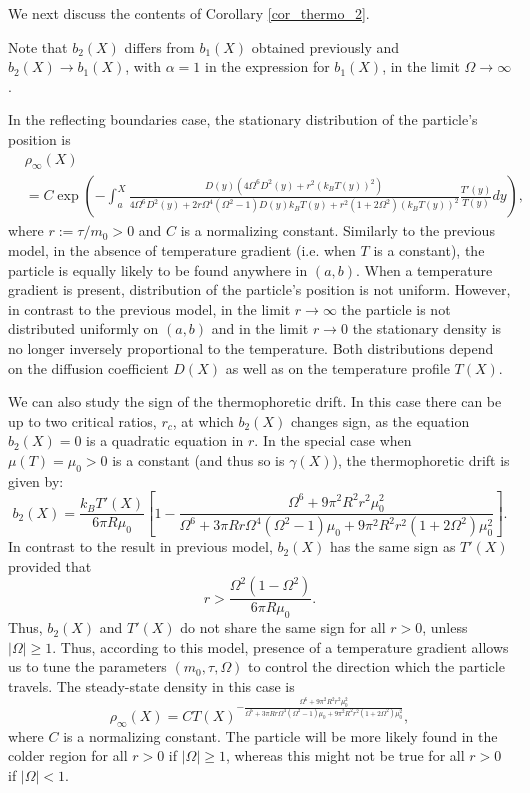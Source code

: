 We next discuss the contents of Corollary \ref{cor_thermo_2}.
\begin{remark}
Note that $b_{2}(X)$ differs from $b_{1}(X)$ obtained previously and $b_{2}(X) \to b_{1}(X)$, with $\alpha =1$ in the expression for $b_{1}(X)$, in the limit $\Omega \to \infty$.
\end{remark} 


In the reflecting boundaries case, the stationary distribution of the particle's position is 
\begin{align}
&\rho_{\infty}(X) \nonumber \\
&= C \exp{\left(-\int_{a}^{X} \frac{D(y)(4\Omega^6D^2(y)+r^2 (k_{B}T(y))^2)}{4 \Omega^6 D^2(y)+2r\Omega^4(\Omega^2-1)D(y)k_{B}T(y)+r^2(1+2\Omega^2)(k_{B}T(y))^2 }\frac{T'(y)}{T(y)} dy \right)}, \end{align}  
where $r := \tau/m_{0} > 0$  and $C$ is a normalizing constant. Similarly to the previous model, in the absence of temperature gradient (i.e. when $T$ is a constant), the particle is equally likely to be found anywhere in $(a,b)$. When a temperature gradient is present, distribution of the particle's position is not uniform. However, in contrast to the previous model, in the limit $r \to \infty$ the particle is not distributed uniformly on $(a,b)$ and in the limit $r \to 0$ the stationary density is no longer inversely proportional to the temperature. Both distributions depend on the diffusion coefficient $D(X)$ as well as on the temperature profile $T(X)$.

We can also study the sign of the thermophoretic drift. In this case there can be up to two critical ratios, 
$r_{c}$, at which $b_{2}(X)$ changes sign, as the equation $b_{2}(X) = 0$ is a quadratic equation in $r$.  In the special case when $\mu(T)=\mu_{0} > 0$ is a constant (and thus so is $\gamma(X)$), the thermophoretic drift is given by:
\begin{equation}b_{2}(X) = \frac{k_{B}T'(X)}{6 \pi R \mu_{0}} \left[1 - \frac{\Omega^6+9\pi^2R^2r^2\mu^{2}_{0}}{\Omega^6+3 \pi R r \Omega^4(\Omega^2-1)\mu_{0} +9\pi^2 R^2 r^2(1+2\Omega^2)\mu^2_{0}}  \right].\end{equation} In contrast to the result in previous model, $b_{2}(X)$ has the same sign as $T'(X)$  provided that \begin{equation}r > \frac{\Omega^2(1-\Omega^2)}{6\pi R \mu_{0}}.\end{equation}  Thus, $b_{2}(X)$ and $T'(X)$ do not share the same sign for all $r>0$, unless $ |\Omega| \geq 1.$ Thus, according to this model, presence of a temperature gradient allows us to tune the parameters $(m_{0}, \tau, \Omega)$ to control the direction which the particle travels.
The steady-state density in this case is \begin{equation}\rho_{\infty}(X) = C T(X)^{-\frac{\Omega^6+9\pi^2R^2r^2\mu^{2}_{0}}{\Omega^6+3 \pi R r \Omega^4(\Omega^2-1)\mu_{0} +9\pi^2 R^2 r^2(1+2\Omega^2)\mu^2_{0}}},\end{equation} where $C$ is a normalizing constant. The particle will be more likely found in the colder region for all $r>0$ if $|\Omega| \geq 1$, whereas this might not be true for all $r>0$ if $|\Omega| < 1$. 

